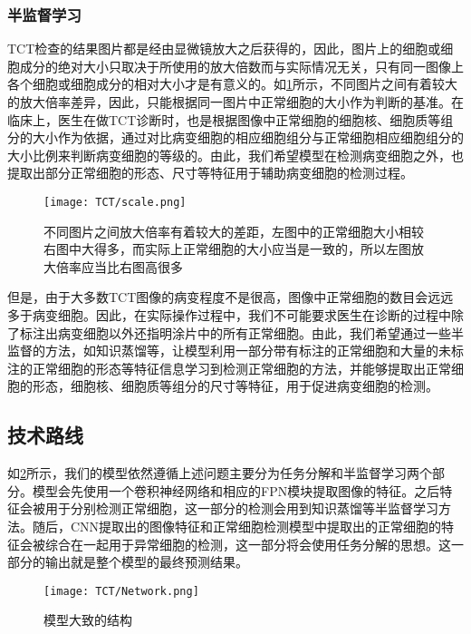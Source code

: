 \subsubsection{半监督学习}
\par TCT检查的结果图片都是经由显微镜放大之后获得的，因此，图片上的细胞或细胞成分的绝对大小只取决于所使用的放大倍数而与实际情况无关，只有同一图像上各个细胞或细胞成分的相对大小才是有意义的。如\ref{放大倍率差异}所示，不同图片之间有着较大的放大倍率差异，因此，只能根据同一图片中正常细胞的大小作为判断的基准。在临床上，医生在做TCT诊断时，也是根据图像中正常细胞的细胞核、细胞质等组分的大小作为依据，通过对比病变细胞的相应细胞组分与正常细胞相应细胞组分的大小比例来判断病变细胞的等级的。由此，我们希望模型在检测病变细胞之外，也提取出部分正常细胞的形态、尺寸等特征用于辅助病变细胞的检测过程。
\begin{figure}[h]
    \centering
    \texttt{[image: TCT/scale.png]}
    \caption{不同图片之间放大倍率有着较大的差距，左图中的正常细胞大小相较右图中大得多，而实际上正常细胞的大小应当是一致的，所以左图放大倍率应当比右图高很多}
    \label{放大倍率差异}
\end{figure}
\par 但是，由于大多数TCT图像的病变程度不是很高，图像中正常细胞的数目会远远多于病变细胞。因此，在实际操作过程中，我们不可能要求医生在诊断的过程中除了标注出病变细胞以外还指明涂片中的所有正常细胞。由此，我们希望通过一些半监督的方法，如知识蒸馏等，让模型利用一部分带有标注的正常细胞和大量的未标注的正常细胞的形态等特征信息学习到检测正常细胞的方法，并能够提取出正常细胞的形态，细胞核、细胞质等组分的尺寸等特征，用于促进病变细胞的检测。
\subsection{技术路线}
\par 如\ref{模型结构}所示，我们的模型依然遵循上述问题主要分为任务分解和半监督学习两个部分。模型会先使用一个卷积神经网络和相应的FPN模块提取图像的特征。之后特征会被用于分别检测正常细胞，这一部分的检测会用到知识蒸馏等半监督学习方法。随后，CNN提取出的图像特征和正常细胞检测模型中提取出的正常细胞的特征会被综合在一起用于异常细胞的检测，这一部分将会使用任务分解的思想。这一部分的输出就是整个模型的最终预测结果。
\begin{figure}[h]
    \centering
    \texttt{[image: TCT/Network.png]}
    \caption{模型大致的结构}
    \label{模型结构}
\end{figure}
